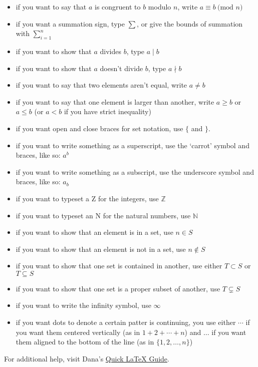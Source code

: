 \documentclass[12pt]{article}
\newcommand{\N}{\mathbb{N}}
\newcommand{\Z}{\mathbb{Z}}
\renewcommand{\mod}[1]{~\textrm{(mod }#1\textrm{)}}
\begin{document}
\begin{itemize}
\item if you want to say that $a$ is congruent to $b$ modulo $n$, write $a \equiv b \mod{n}$
\item if you want a summation sign, type $\sum$, or give the bounds of summation with $\sum_{i=1}^{n}$
\item if you want to show that $a$ divides $b$, type $a \mid b$
\item if you want to show that $a$ doesn't divide $b$, type $a \nmid b$
\item if you want to say that two elements aren't equal, write $a \neq b$
\item if you want to say that one element is larger than another, write $a \geq b$ or $a \leq b$ (or $a<b$ if you have strict inequality)
\item if you want open and close braces for set notation, use $\{$ and $\}$. 
\item if you want to write something as a superscript, use the `carrot' symbol and braces, like so: $a^{b}$
\item if you want to write something as a subscript, use the underscore symbol and braces, like so: $a_{b}$
\item if you want to typeset a Z for the integers, use $\Z$
\item if you want to typeset an N for the natural numbers, use $\N$
\item if you want to show that an element is in a set, use $n \in S$
\item if you want to show that an element is not in a set, use $n \notin S$
\item if you want to show that one set is contained in another, use either $T \subset S$ or $T\subseteq S$
\item if you want to show that one set is a proper subset of another, use $T \subsetneq S$
\item if you want to write the infinity symbol, use $\infty$
\item if you want dots to denote a certain patter is continuing, you use either $\cdots$ if you want them centered vertically (as in $1+2+\cdots+n$) and $\ldots$ if you want them aligned to the bottom of the line (as in $\{1,2,\ldots,n\}$)
\end{itemize}

For additional help, visit Dana's \href{http://oz.plymouth.edu/~dcernst/latex.html}{Quick LaTeX Guide}.

\end{document}
